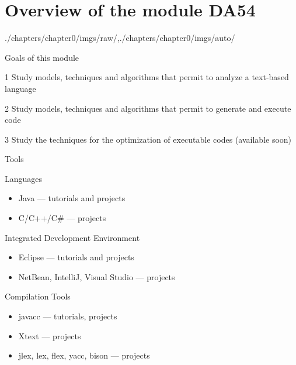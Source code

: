 \part[author={\protect\insertauthor},label={chap:moduleoverview}]{Overview of the module DA54}

\begin{graphicspathcontext}{{./chapters/chapter0/imgs/raw/},{./chapters/chapter0/imgs/auto/}}
		
\begin{frame}{Goals of this module}
	\begin{leftanchorblock}{}{1}
		Study models, techniques and algorithms that permit to analyze a text-based language
	\end{leftanchorblock}
	\vspace{0.5cm}
	\begin{rightanchorblock}{}{2}
		Study models, techniques and algorithms that permit to generate and execute code
	\end{rightanchorblock}
	\begin{leftanchorblock}{}{3}
		Study the techniques for the optimization of executable codes \alert{(available soon)}
	\end{leftanchorblock}
\end{frame}

\tableofcontentslide[onlyparts]

\begin{frame}[background=6]{Tools}
	\begin{block}{Languages}
		\begin{itemize}
		\item Java --- tutorials and projects
		\item C/C++/C\# --- projects
		\end{itemize}
	\end{block}
	\begin{block}{Integrated Development Environment}
		\begin{itemize}
		\item Eclipse --- tutorials and projects
		\item NetBean, IntelliJ, Visual Studio --- projects
		\end{itemize}
	\end{block}
	\begin{block}{Compilation Tools}
		\begin{itemize}
		\item javacc --- tutorials, projects
		\item Xtext --- projects
		\item jlex, lex, flex, yacc, bison --- projects
		\end{itemize}
	\end{block}
\end{frame}


\end{graphicspathcontext}
